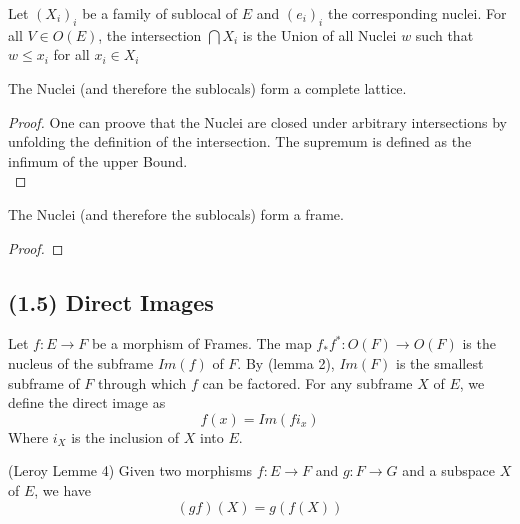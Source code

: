 \begin{definition}
    \label{def:sublocal_intersection}
    \leanok
    Let $(X_i)_i$ be a family of sublocal of $E$ and $(e_i)_i$ the corresponding nuclei.
    For all $V \in O(E)$, the intersection $\bigcap X_i$ is the Union of all Nuclei $w$ such that $w \le x_i $ for all $x_i \in X_i $
\end{definition}

\begin{lemma}
    \label{lem:nucleus_complete_lattice}
    \leanok
    The Nuclei (and therefore the sublocals) form a complete lattice.
\end{lemma}
\begin{proof}
    One can proove that the Nuclei are closed under arbitrary intersections by unfolding the definition of the intersection. The supremum is defined as the infimum of the upper Bound. \\
    \leanok
\end{proof}

\begin{lemma}
    \label{lem:nucleus_frame}
    \leanok
    The Nuclei (and therefore the sublocals) form a frame.
\end{lemma}
\begin{proof}
\end{proof}

\subsection{(1.5) Direct Images}

\begin{definition}
    \label{def:direct_images}
    Let $f : E \rightarrow F$ be a morphism of Frames. The map $f_*f^* : O(F) \to O(F)$ is the nucleus of the subframe
    $Im(f)$ of $F$. By (lemma 2), $Im(F)$ is the smallest subframe of $F$ through which $f$ can be factored. For any subframe $X$ of $E$, we define the direct image as
    \[f(x) = Im(fi_x)\]
    Where $i_X$ is the inclusion of $X$ into $E$.
\end{definition}

\begin{lemma}
(Leroy Lemme 4)
    \label{lem:direct_images_transitive}
    Given two morphisms $f : E \rightarrow F$ and $g : F \rightarrow G$ and a subspace $X$ of $E$, we have
    \[(gf)(X) = g(f(X))\]
\end{lemma}

